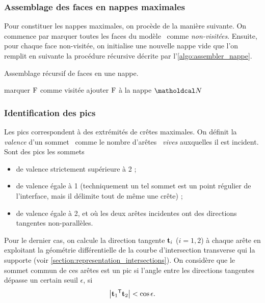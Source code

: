 \subsubsection{Assemblage des faces en nappes maximales}
Pour constituer les nappes maximales, on procède de la manière suivante. 
On commence par marquer toutes les faces du modèle \brep\ comme \textit{non-visitées}. 
Ensuite, pour chaque face non-visitée, on initialise une nouvelle nappe vide que l'on remplit en suivante la procédure récursive décrite par l'\autoref{algo:assembler_nappe}.

\begin{algorithm}
	\caption{Assemblage récursif de faces en une nappe.}\label{algo:assembler_nappe}
	\begin{algorithmic}[1]
			\State marquer $\mathrm{F}$ comme visitée
			\State ajouter $\mathrm{F}$ à la nappe $\nappe$
						\State {}
					\EndIf
				\EndFor
			\EndFor
		\EndProcedure
	\end{algorithmic}
\end{algorithm}


\subsubsection{Identification des pics}
Les pics correspondent à des extrémités de crêtes maximales. 
On définit la \textit{valence} d'un sommet \brep\ comme le nombre d'arêtes \brep\ \textit{vives} auxquelles il est incident. 
Sont des pics les sommets
\begin{itemize}
	\item de valence strictement supérieure à 2 ;
	\item de valence égale à 1 (techniquement un tel sommet est un point régulier de l'interface, mais il délimite tout de même une crête) ;
	\item de valence égale à 2, et où les deux arêtes incidentes ont des directions tangentes non-parallèles.
\end{itemize}

Pour le dernier cas, on calcule la direction tangente $\mathbf{t}_i$ ($i = 1,2$) à chaque arête en exploitant la géométrie différentielle de la courbe d'intersection transverse qui la supporte (voir \autoref{section:representation_intersections}). 
On considère que le sommet commun de ces arêtes est un pic si l'angle entre les directions tangentes dépasse un certain seuil $\epsilon$, \ie si 
\begin{equation}
	\left| {\mathbf{t}_1} ^\mathsf{T} {\mathbf{t}_2} \right| < \cos \epsilon.
\end{equation}



